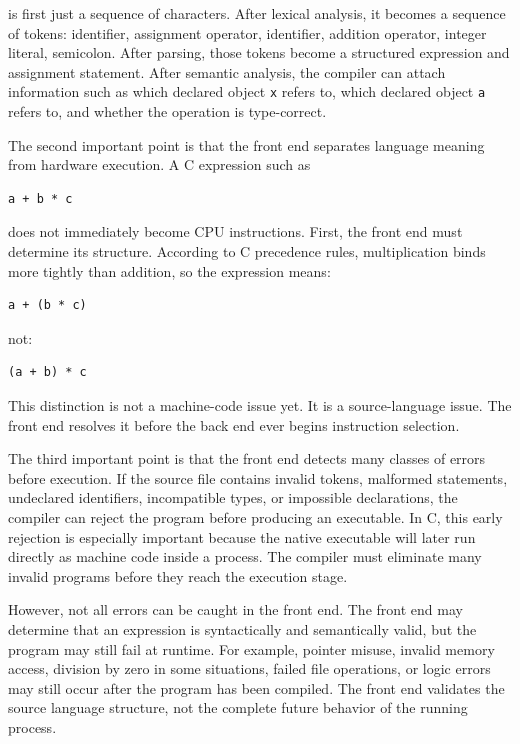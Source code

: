 is first just a sequence of characters. After lexical analysis, it becomes a sequence of tokens: identifier, assignment operator, identifier, addition operator, integer literal, semicolon. After parsing, those tokens become a structured expression and assignment statement. After semantic analysis, the compiler can attach information such as which declared object \texttt{x} refers to, which declared object \texttt{a} refers to, and whether the operation is type-correct.

The second important point is that the front end separates language meaning from hardware execution. A C expression such as

\begin{verbatim}
a + b * c
\end{verbatim}

does not immediately become CPU instructions. First, the front end must determine its structure. According to C precedence rules, multiplication binds more tightly than addition, so the expression means:

\begin{verbatim}
a + (b * c)
\end{verbatim}

not:

\begin{verbatim}
(a + b) * c
\end{verbatim}

This distinction is not a machine-code issue yet. It is a source-language issue. The front end resolves it before the back end ever begins instruction selection.

The third important point is that the front end detects many classes of errors before execution. If the source file contains invalid tokens, malformed statements, undeclared identifiers, incompatible types, or impossible declarations, the compiler can reject the program before producing an executable. In C, this early rejection is especially important because the native executable will later run directly as machine code inside a process. The compiler must eliminate many invalid programs before they reach the execution stage.

However, not all errors can be caught in the front end. The front end may determine that an expression is syntactically and semantically valid, but the program may still fail at runtime. For example, pointer misuse, invalid memory access, division by zero in some situations, failed file operations, or logic errors may still occur after the program has been compiled. The front end validates the source language structure, not the complete future behavior of the running process.

